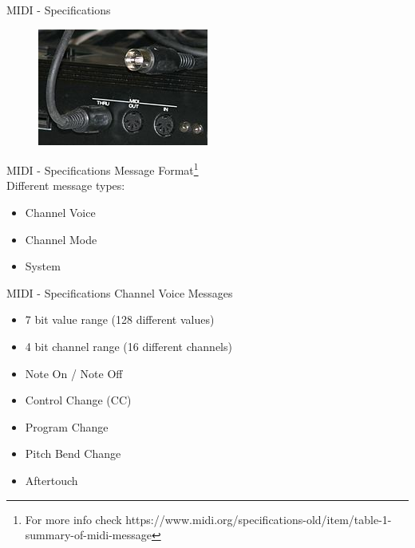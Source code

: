 \documentclass{beamer}
\begin{document}
\begin{frame}{MIDI - Specifications}
    \begin{figure}[h]
        \includegraphics[width=\textwidth]{212px-Midi_ports_and_cable.jpg}
    \end{figure}
\end{frame}

\begin{frame}{MIDI - Specifications}
    Message Format\footnote{For more info check https://www.midi.org/specifications-old/item/table-1-summary-of-midi-message}\\
    \vspace{5mm}
    Different message types:
    \begin{itemize}
        \item Channel Voice
        \item Channel Mode
        \item System
    \end{itemize}
    
    
\end{frame}

\begin{frame}{MIDI - Specifications}
    Channel Voice Messages\\
    \begin{itemize}
        \item 7 bit value range (128 different values)
        \item 4 bit channel range (16 different channels)
    \end{itemize}
    \vspace{5mm}
    \begin{itemize}
        \item Note On / Note Off
        \item Control Change (CC)
        \item Program Change
        \item Pitch Bend Change
        \item Aftertouch
    \end{itemize}
\end{frame}
\end{document}

